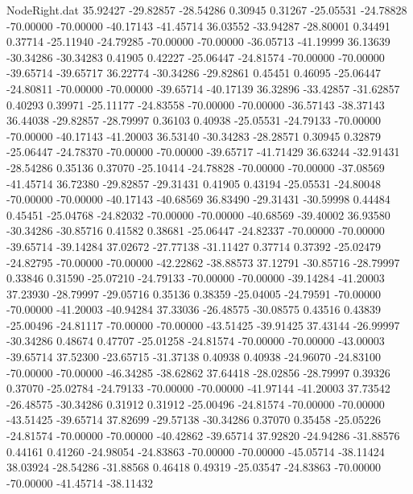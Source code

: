 \begin{filecontents}{NodeRight.dat}
  35.92427  -29.82857  -28.54286     0.30945    0.31267  -25.05531  -24.78828  -70.00000  -70.00000  -40.17143  -41.45714
  36.03552  -33.94287  -28.80001     0.34491    0.37714  -25.11940  -24.79285  -70.00000  -70.00000  -36.05713  -41.19999
  36.13639  -30.34286  -30.34283     0.41905    0.42227  -25.06447  -24.81574  -70.00000  -70.00000  -39.65714  -39.65717
  36.22774  -30.34286  -29.82861     0.45451    0.46095  -25.06447  -24.80811  -70.00000  -70.00000  -39.65714  -40.17139
  36.32896  -33.42857  -31.62857     0.40293    0.39971  -25.11177  -24.83558  -70.00000  -70.00000  -36.57143  -38.37143
  36.44038  -29.82857  -28.79997     0.36103    0.40938  -25.05531  -24.79133  -70.00000  -70.00000  -40.17143  -41.20003
  36.53140  -30.34283  -28.28571     0.30945    0.32879  -25.06447  -24.78370  -70.00000  -70.00000  -39.65717  -41.71429
  36.63244  -32.91431  -28.54286     0.35136    0.37070  -25.10414  -24.78828  -70.00000  -70.00000  -37.08569  -41.45714
  36.72380  -29.82857  -29.31431     0.41905    0.43194  -25.05531  -24.80048  -70.00000  -70.00000  -40.17143  -40.68569
  36.83490  -29.31431  -30.59998     0.44484    0.45451  -25.04768  -24.82032  -70.00000  -70.00000  -40.68569  -39.40002
  36.93580  -30.34286  -30.85716     0.41582    0.38681  -25.06447  -24.82337  -70.00000  -70.00000  -39.65714  -39.14284
  37.02672  -27.77138  -31.11427     0.37714    0.37392  -25.02479  -24.82795  -70.00000  -70.00000  -42.22862  -38.88573
  37.12791  -30.85716  -28.79997     0.33846    0.31590  -25.07210  -24.79133  -70.00000  -70.00000  -39.14284  -41.20003
  37.23930  -28.79997  -29.05716     0.35136    0.38359  -25.04005  -24.79591  -70.00000  -70.00000  -41.20003  -40.94284
  37.33036  -26.48575  -30.08575     0.43516    0.43839  -25.00496  -24.81117  -70.00000  -70.00000  -43.51425  -39.91425
  37.43144  -26.99997  -30.34286     0.48674    0.47707  -25.01258  -24.81574  -70.00000  -70.00000  -43.00003  -39.65714
  37.52300  -23.65715  -31.37138     0.40938    0.40938  -24.96070  -24.83100  -70.00000  -70.00000  -46.34285  -38.62862
  37.64418  -28.02856  -28.79997     0.39326    0.37070  -25.02784  -24.79133  -70.00000  -70.00000  -41.97144  -41.20003
  37.73542  -26.48575  -30.34286     0.31912    0.31912  -25.00496  -24.81574  -70.00000  -70.00000  -43.51425  -39.65714
  37.82699  -29.57138  -30.34286     0.37070    0.35458  -25.05226  -24.81574  -70.00000  -70.00000  -40.42862  -39.65714
  37.92820  -24.94286  -31.88576     0.44161    0.41260  -24.98054  -24.83863  -70.00000  -70.00000  -45.05714  -38.11424
  38.03924  -28.54286  -31.88568     0.46418    0.49319  -25.03547  -24.83863  -70.00000  -70.00000  -41.45714  -38.11432

\end{filecontents}
